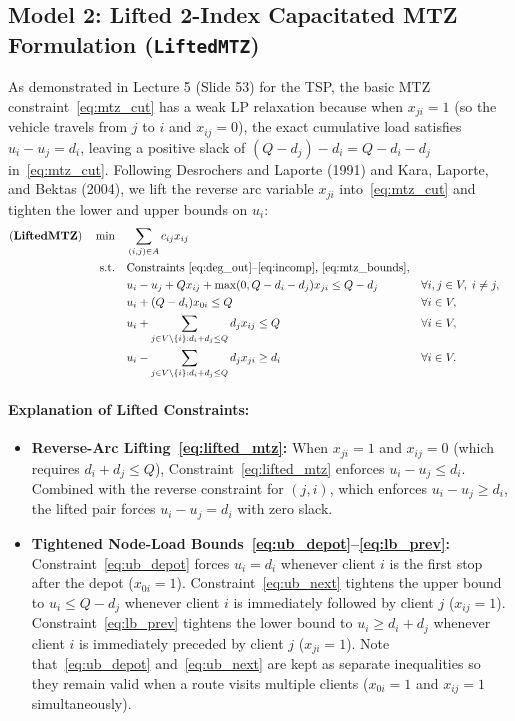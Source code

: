 \documentclass[11pt,a4paper]{article}
\begin{document}
\subsection{Model 2: Lifted 2-Index Capacitated MTZ Formulation (\texttt{LiftedMTZ})}
As demonstrated in Lecture 5 (Slide 53) for the TSP, the basic MTZ constraint~\eqref{eq:mtz_cut} has a weak LP relaxation because when $x_{ji} = 1$ (so the vehicle travels from $j$ to $i$ and $x_{ij} = 0$), the exact cumulative load satisfies $u_i - u_j = d_i$, leaving a positive slack of $(Q - d_j) - d_i = Q - d_i - d_j$ in~\eqref{eq:mtz_cut}. Following Desrochers and Laporte (1991) and Kara, Laporte, and Bektas (2004), we lift the reverse arc variable $x_{ji}$ into~\eqref{eq:mtz_cut} and tighten the lower and upper bounds on $u_i$:
\begin{align}
\text{(\textbf{LiftedMTZ})} \quad \min \quad & \sum_{(i,j) \in A} c_{ij} x_{ij} \nonumber \\
\text{s.t.} \quad & \text{Constraints~\eqref{eq:deg_out}--\eqref{eq:incomp}, \eqref{eq:mtz_bounds}}, \nonumber \\
& u_i - u_j + Q x_{ij} + \max(0, Q - d_i - d_j) x_{ji} \le Q - d_j && \forall i, j \in V, \; i \neq j, \label{eq:lifted_mtz} \\
& u_i + (Q - d_i) x_{0i} \le Q && \forall i \in V, \label{eq:ub_depot} \\
& u_i + \sum_{j \in V \setminus \{i\} : d_i + d_j \le Q} d_j x_{ij} \le Q && \forall i \in V, \label{eq:ub_next} \\
& u_i - \sum_{j \in V \setminus \{i\} : d_i + d_j \le Q} d_j x_{ji} \ge d_i && \forall i \in V. \label{eq:lb_prev}
\end{align}
\paragraph{Explanation of Lifted Constraints:}
\begin{itemize}[noitemsep,topsep=2pt]
    \item \textbf{Reverse-Arc Lifting~\eqref{eq:lifted_mtz}:} When $x_{ji} = 1$ and $x_{ij} = 0$ (which requires $d_i + d_j \le Q$), Constraint~\eqref{eq:lifted_mtz} enforces $u_i - u_j \le d_i$. Combined with the reverse constraint for $(j, i)$, which enforces $u_i - u_j \ge d_i$, the lifted pair forces $u_i - u_j = d_i$ with zero slack.
    \item \textbf{Tightened Node-Load Bounds~\eqref{eq:ub_depot}--\eqref{eq:lb_prev}:} Constraint~\eqref{eq:ub_depot} forces $u_i = d_i$ whenever client $i$ is the first stop after the depot ($x_{0i} = 1$). Constraint~\eqref{eq:ub_next} tightens the upper bound to $u_i \le Q - d_j$ whenever client $i$ is immediately followed by client $j$ ($x_{ij} = 1$). Constraint~\eqref{eq:lb_prev} tightens the lower bound to $u_i \ge d_i + d_j$ whenever client $i$ is immediately preceded by client $j$ ($x_{ji} = 1$). Note that~\eqref{eq:ub_depot} and~\eqref{eq:ub_next} are kept as separate inequalities so they remain valid when a route visits multiple clients ($x_{0i} = 1$ and $x_{ij} = 1$ simultaneously).
\end{itemize}
\end{document}

